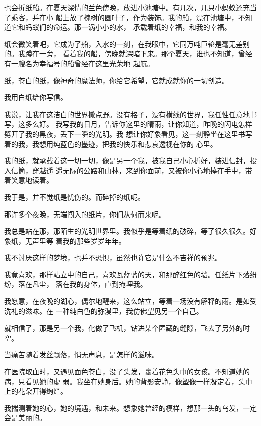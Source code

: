 		也会折纸船。在夏天深情的兰色傍晚，放进小池塘中。有几次，几只小蚂蚁还充当了乘客，并在小
	船上放了槐树的圆叶子，作为装饰。我的船，漂在池塘中，不知道它和蚂蚁们的命运。那一涡小小的水，
	承载着纸的幸福，和我的幸福。

		纸会微笑着吧，它成为了船，入水的一刻，在我眼中，它同万吨巨轮是毫无差别的。我蹲在一旁，
	看着我的船，傍晚就深暗下来。那个夏天，谁也不知道，曾经有一艘名为幸福号的船曾经在这里光荣地
	起航。


		纸，苍白的纸，像神奇的魔法师，你给它希望，它就成就你的一切创造。

		我用白纸给你写信。

		我说，让我在这洁白的世界撒点野。没有格子，没有横线的世界，我任性任意地书写，这多么好。
	我写我的日月，告诉你这里的晴雨，让你知道，昨晚的闪电怎样劈开了我的黑夜，丢下一瞬的光明。我
	想让你好象看见，这一刻静坐在这里书写着的我，我想用纯蓝色的墨迹，把我的快乐和悲哀透视在你的
	心里。

		我的纸，就承载着这一切一切，像是另一个我，被我自己小心折好，装进信封，投入信筒，穿越遥
	遥无际的公路和山林，来到你面前，又被你小心地捧在手中，带着笑意地读着。


		我于是，并不觉纸是忧伤的。而碎掉的纸呢。


		那许多个夜晚，无端闯入的纸片，你们从何而来呢。

		我总是站在那，那陌生的光明世界里。我似乎是等着纸的破碎，等了很久很久。好象纸，无声里等
	着我的那些岁岁年年。

		我不讨厌这样的梦境，也并不恐惧，虽然也许它是什么不吉祥的预兆。

		我竟喜欢，那样站立中的自己，喜欢瓦蓝蓝的天，和那醉红色的墙。任纸片下落纷纷，落在凡尘，
	落在我的身体，直到掩埋我。

		我愿意，在夜晚的湖心，偶尔地醒来，这么站立，等着一场没有解释的雨。是如受洗礼的滋味。在
	一种纯白色的弥漫里，我仿佛望见另一个自己。


		就相信了，那是另一个我，化做了飞机，钻进某个匿藏的缝隙，飞去了另外的时空。

	\endwriting



		当痛苦随着发丝飘落，悄无声息，是怎样的滋味。

		在医院取血时，又遇见面色苍白，没了头发，裹着花色头巾的女孩。不知道她的病，只看见她的虚
	弱。我坐在她身后。她的背影安静，像塑像一样凝定着，头巾上的花朵开得绚烂。

		我揣测着她的心，她的境遇，和未来。想象她曾经的模样，想那一头的乌发，一定会是美丽的。

